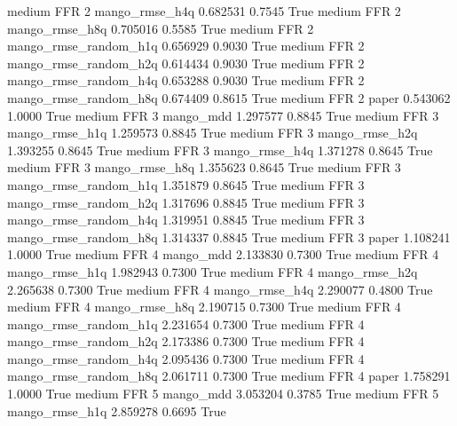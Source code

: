     medium      FFR                 2        mango_rmse_h4q   0.682531      0.7545    True
    medium      FFR                 2        mango_rmse_h8q   0.705016      0.5585    True
    medium      FFR                 2 mango_rmse_random_h1q   0.656929      0.9030    True
    medium      FFR                 2 mango_rmse_random_h2q   0.614434      0.9030    True
    medium      FFR                 2 mango_rmse_random_h4q   0.653288      0.9030    True
    medium      FFR                 2 mango_rmse_random_h8q   0.674409      0.8615    True
    medium      FFR                 2                 paper   0.543062      1.0000    True
    medium      FFR                 3             mango_mdd   1.297577      0.8845    True
    medium      FFR                 3        mango_rmse_h1q   1.259573      0.8845    True
    medium      FFR                 3        mango_rmse_h2q   1.393255      0.8645    True
    medium      FFR                 3        mango_rmse_h4q   1.371278      0.8645    True
    medium      FFR                 3        mango_rmse_h8q   1.355623      0.8645    True
    medium      FFR                 3 mango_rmse_random_h1q   1.351879      0.8645    True
    medium      FFR                 3 mango_rmse_random_h2q   1.317696      0.8845    True
    medium      FFR                 3 mango_rmse_random_h4q   1.319951      0.8845    True
    medium      FFR                 3 mango_rmse_random_h8q   1.314337      0.8845    True
    medium      FFR                 3                 paper   1.108241      1.0000    True
    medium      FFR                 4             mango_mdd   2.133830      0.7300    True
    medium      FFR                 4        mango_rmse_h1q   1.982943      0.7300    True
    medium      FFR                 4        mango_rmse_h2q   2.265638      0.7300    True
    medium      FFR                 4        mango_rmse_h4q   2.290077      0.4800    True
    medium      FFR                 4        mango_rmse_h8q   2.190715      0.7300    True
    medium      FFR                 4 mango_rmse_random_h1q   2.231654      0.7300    True
    medium      FFR                 4 mango_rmse_random_h2q   2.173386      0.7300    True
    medium      FFR                 4 mango_rmse_random_h4q   2.095436      0.7300    True
    medium      FFR                 4 mango_rmse_random_h8q   2.061711      0.7300    True
    medium      FFR                 4                 paper   1.758291      1.0000    True
    medium      FFR                 5             mango_mdd   3.053204      0.3785    True
    medium      FFR                 5        mango_rmse_h1q   2.859278      0.6695    True
